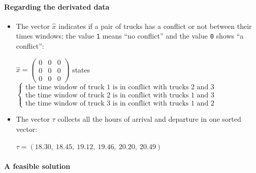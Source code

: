 \documentclass[preprint,12pt,authoryear]{elsarticle}
\begin{document}
 
\paragraph{Regarding the derivated data}
\begin{itemize}
    \item The vector $\hat{x}$ indicates if a pair of trucks has a conflict or not between their times windows; the value \texttt{1} means ``no conflict'' and the value \texttt{0} shows ``a conflict'':  
    
    $\hat{x}=\begin{pmatrix} 
    0&0&0 \\ 
    0&0&0 \\  
    0&0&0
   \end{pmatrix}$  states 
   $\begin{cases}
     \mbox{the time window of truck 1 is in conflict with trucks 2 and 3}\\
     \mbox{the time window of truck 2 is in conflict with trucks 1 and 3}\\
     \mbox{the time window of truck 3 is in conflict with trucks 1 and 2}
   \end{cases}$

   \item The vector $\tau$ collects all the hours of arrival and departure in one sorted vector: 

      $\tau = (18.30,\ 18.45,\ 19.12,\ 19.46,\ 20.20,\ 20.49)$ 

\end{itemize}

  
\vspace{-4mm}
\paragraph{A feasible solution}
\end{document}
